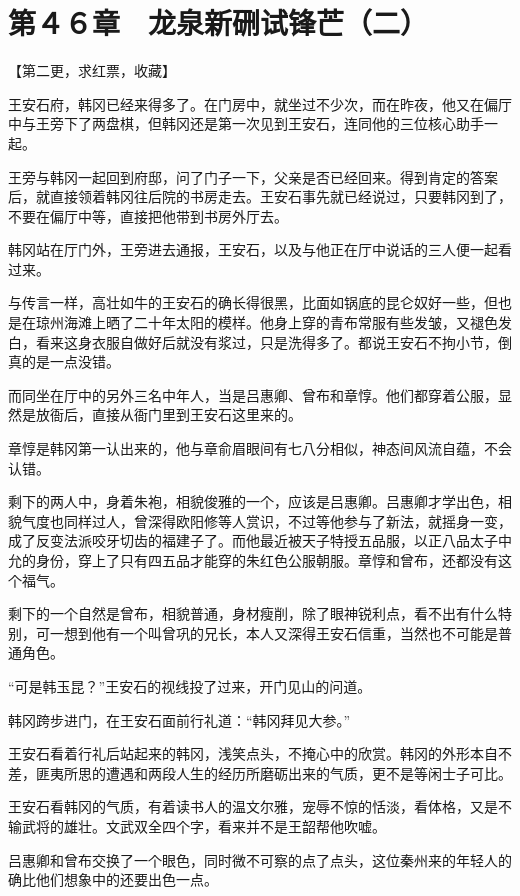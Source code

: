 \section{第４６章　龙泉新硎试锋芒（二）}

【第二更，求红票，收藏】

王安石府，韩冈已经来得多了。在门房中，就坐过不少次，而在昨夜，他又在偏厅中与王旁下了两盘棋，但韩冈还是第一次见到王安石，连同他的三位核心助手一起。

王旁与韩冈一起回到府邸，问了门子一下，父亲是否已经回来。得到肯定的答案后，就直接领着韩冈往后院的书房走去。王安石事先就已经说过，只要韩冈到了，不要在偏厅中等，直接把他带到书房外厅去。

韩冈站在厅门外，王旁进去通报，王安石，以及与他正在厅中说话的三人便一起看过来。

与传言一样，高壮如牛的王安石的确长得很黑，比面如锅底的昆仑奴好一些，但也是在琼州海滩上晒了二十年太阳的模样。他身上穿的青布常服有些发皱，又褪色发白，看来这身衣服自做好后就没有浆过，只是洗得多了。都说王安石不拘小节，倒真的是一点没错。

而同坐在厅中的另外三名中年人，当是吕惠卿、曾布和章惇。他们都穿着公服，显然是放衙后，直接从衙门里到王安石这里来的。

章惇是韩冈第一认出来的，他与章俞眉眼间有七八分相似，神态间风流自蕴，不会认错。

剩下的两人中，身着朱袍，相貌俊雅的一个，应该是吕惠卿。吕惠卿才学出色，相貌气度也同样过人，曾深得欧阳修等人赏识，不过等他参与了新法，就摇身一变，成了反变法派咬牙切齿的福建子了。而他最近被天子特授五品服，以正八品太子中允的身份，穿上了只有四五品才能穿的朱红色公服朝服。章惇和曾布，还都没有这个福气。

剩下的一个自然是曾布，相貌普通，身材瘦削，除了眼神锐利点，看不出有什么特别，可一想到他有一个叫曾巩的兄长，本人又深得王安石信重，当然也不可能是普通角色。

“可是韩玉昆？”王安石的视线投了过来，开门见山的问道。

韩冈跨步进门，在王安石面前行礼道：“韩冈拜见大参。”

王安石看着行礼后站起来的韩冈，浅笑点头，不掩心中的欣赏。韩冈的外形本自不差，匪夷所思的遭遇和两段人生的经历所磨砺出来的气质，更不是等闲士子可比。

王安石看韩冈的气质，有着读书人的温文尔雅，宠辱不惊的恬淡，看体格，又是不输武将的雄壮。文武双全四个字，看来并不是王韶帮他吹嘘。

吕惠卿和曾布交换了一个眼色，同时微不可察的点了点头，这位秦州来的年轻人的确比他们想象中的还要出色一点。


